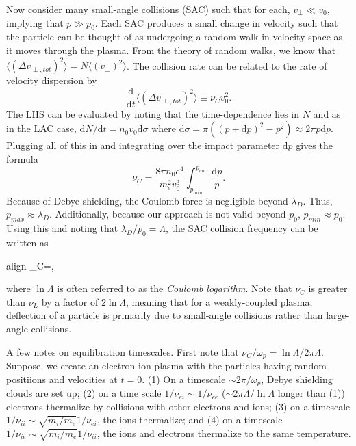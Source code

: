 	Now consider many small-angle collisions (SAC) such that for each, $v_{\perp}\ll v_0$, implying that $p\gg p_0$. Each SAC produces a small change in velocity such that the particle can be thought of as undergoing a random walk in velocity space as it moves through the plasma. From the theory of random walks, we know that $\langle(\Delta v_{\perp,tot})^2\rangle=N\langle(v_{\perp})^2\rangle$. The collision rate can be related to the rate of velocity dispersion by 
	\begin{equation}
		\frac{\mathrm{d}}{\mathrm{d}t}\langle(\Delta v_{\perp,tot})^2 \rangle \equiv \nu_Cv_0^2. 
	\end{equation}
	The LHS can be evaluated by noting that the time-dependence lies in $N$ and as in the LAC case, $\mathrm{d}N/\mathrm{d}t=n_0v_0\mathrm{d}\sigma$ where $\mathrm{d}\sigma=\pi((p+\mathrm{d}p)^2 - p^2)\approx2\pi p\mathrm{d}p$. Plugging all of this in and integrating over the impact parameter $\mathrm{d}p$ gives the formula
	\begin{equation}
		\nu_C=\frac{8\pi n_0e^4}{m_e^2v_0^3}\int^{p_{max}}_{p_{min}}\frac{\mathrm{d}p}{p}.
	\end{equation}
	Because of Debye shielding, the Coulomb force is negligible beyond $\lambda_D$. Thus, $p_{max}\approx\lambda_D$. Additionally, because our approach is not valid beyond $p_0$, $p_{min}\approx p_0$. Using this and noting that $\lambda_D/p_0=\Lambda$, the SAC collision frequency can be written as 
	\begin{empheq}[box=\widefbox]{align}
		\label{eq:sac_freq}
		\nu_C=\ln{\Lambda},
	\end{empheq}
	where $\ln{\Lambda}$ is often referred to as the \textit{Coulomb logarithm}. Note that $\nu_C$ is greater than $\nu_L$ by a factor of $2\ln{\Lambda}$, meaning that for a weakly-coupled plasma, deflection of a particle is primarily due to small-angle collisions rather than large-angle collisions. 

	A few notes on equilibration timescales. First note that $\nu_C/\omega_p=\ln{\Lambda}/2\pi\Lambda$. Suppose, we create an electron-ion plasma with the particles having random positiions and velocities at $t=0$. (1) On a timescale $\sim2\pi/\omega_p$, Debye shielding clouds are set up; (2) on a time scale $1/\nu_{ei}\sim1/\nu_{ee}$ ($\sim2\pi\Lambda/\ln{\Lambda}$ longer than (1)) electrons thermalize by collisions with other electrons and ions; (3) on a timescale $1/\nu_{ii}\sim\sqrt{m_i/m_e}1/\nu_{ei}$, the ions thermalize; and (4) on a timescale $1/\nu_{ie}\sim\sqrt{m_i/m_e}1/\nu_{ii}$, the ions and electrons thermalize to the same temperature. 

